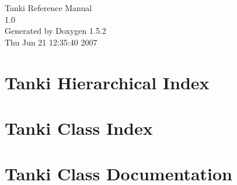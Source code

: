 \documentclass[a4paper]{book}
\begin{document}
\begin{titlepage}
\vspace*{7cm}
\begin{center}
{\Large Tanki Reference Manual\\[1ex]\large 1.0 }\\
\vspace*{1cm}
{\large Generated by Doxygen 1.5.2}\\
\vspace*{0.5cm}
{\small Thu Jun 21 12:35:40 2007}\\
\end{center}
\end{titlepage}
\clearemptydoublepage
{}
\tableofcontents
\clearemptydoublepage
{}
\chapter{Tanki Hierarchical Index}

\chapter{Tanki Class Index}

\chapter{Tanki Class Documentation}




















\printindex
\end{document}
